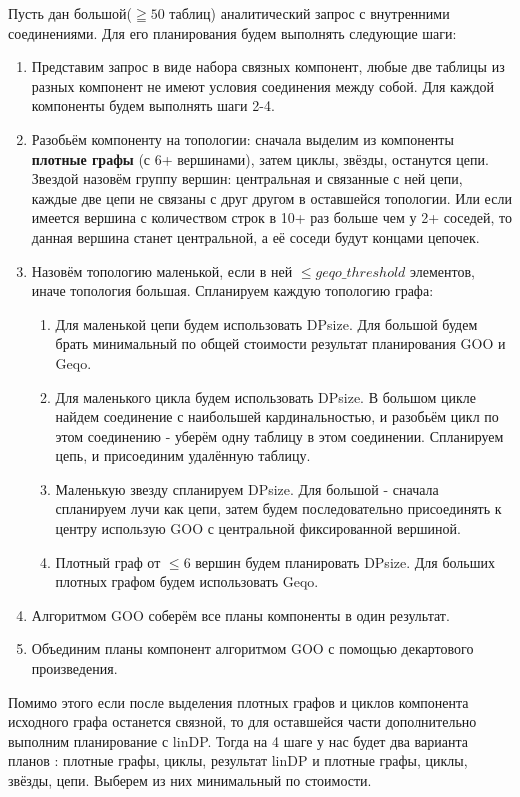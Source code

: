 \documentclass[12pt]{article}
\begin{document}
\begin{flushleft}
Пусть дан большой($\geqq 50$ таблиц) аналитический запрос с внутренними соединениями. Для его планирования будем выполнять 
следующие шаги:
\begin{enumerate}
    \item Представим запрос в виде набора связных компонент, любые две таблицы из разных компонент не имеют условия соединения между собой. 
Для каждой компоненты будем выполнять шаги 2-4.
    \item Разобьём компоненту на топологии: сначала выделим из компоненты \textbf{плотные графы} (с 6+ вершинами), затем циклы, звёзды, останутся цепи. 
Звездой назовём группу вершин: центральная и связанные с ней цепи, каждые две цепи не связаны с друг другом в оставшейся топологии. Или если имеется 
вершина с количеством строк в 10+ раз больше чем у 2+ соседей, то данная вершина станет центральной, а её соседи будут концами цепочек.
    \item Назовём топологию маленькой, если в ней $\leq geqo\_threshold$ элементов, иначе топология большая. Спланируем каждую топологию графа:\newline
    \begin{enumerate}
        \item Для маленькой цепи будем использовать DPsize. Для большой будем брать минимальный по общей стоимости результат планирования 
        GOO и Geqo.
        \item Для маленького цикла будем использовать DPsize. В большом цикле найдем соединение с наибольшей кардинальностью, и разобьём цикл 
        по этом соединению - уберём одну таблицу в этом соединении. Спланируем цепь, и присоединим удалённую таблицу.
        \item Маленькую звезду спланируем DPsize. Для большой - сначала спланируем лучи как цепи, затем будем последовательно присоединять к 
        центру использую GOO с центральной фиксированной вершиной.
        \item Плотный граф от $\leq 6$ вершин будем планировать DPsize. Для больших плотных графом будем использовать Geqo.
    \end{enumerate}
    \item Алгоритмом GOO соберём все планы компоненты в один результат.
    \item Объединим планы компонент алгоритмом GOO с помощью декартового произведения.
\end{enumerate}

Помимо этого если после выделения плотных графов и циклов компонента исходного графа останется связной, то для оставшейся части дополнительно  выполним 
планирование с linDP. Тогда на 4 шаге у нас будет два варианта планов : {плотные графы, циклы, результат linDP} и {плотные графы, циклы, звёзды, цепи}. Выберем из 
них минимальный по стоимости.
\centering 

\raggedright

\end{flushleft}
\end{document}
